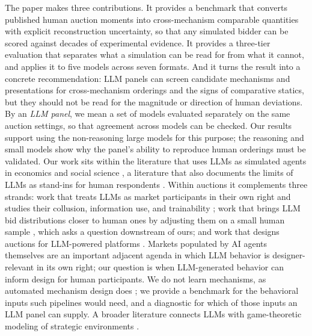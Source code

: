 \documentclass{article} %
\newif\ifmarkrev
\newcommand{\rev}[1]{\ifmarkrev\begingroup\color{red}#1\endgroup\else#1\fi}
\begin{document}
\rev{The paper makes three contributions.
It provides a benchmark that converts published human auction moments into cross-mechanism comparable quantities with explicit reconstruction uncertainty, so that any simulated bidder can be scored against decades of experimental evidence.
It provides a three-tier evaluation that separates what a simulation can be read for from what it cannot, and applies it to five models across seven formats.
And it turns the result into a concrete recommendation: LLM panels can screen candidate mechanisms and presentations for cross-mechanism orderings and the signs of comparative statics, but they should not be read for the magnitude or direction of human deviations. By an \emph{LLM panel}, we mean a set of models evaluated separately on the same auction settings, so that agreement across models can be checked. Our results support using the non-reasoning large models for this purpose; the reasoning and small models show why the panel's ability to reproduce human orderings must be validated.
Our work sits within the literature that uses LLMs as simulated agents in economics and social science \citep{aher2023using, park2023generative, horton2023large, manning2024automated}, a literature that also documents the limits of LLMs as stand-ins for human respondents \citep{achiam2023gpt, bubeck2023sparks, wan2023kelly}.
Within auctions it complements three strands: work that treats LLMs as market participants in their own right and studies their collusion, information use, and trainability \citep{fish2024algorithmic, chen2023put, infobid2025, lu2025claude, tsuchihashi2023homo, auctionnet2024}; work that brings LLM bid distributions closer to human ones by adjusting them on a small human sample \citep{corrigan2025usefulness}, which asks a question downstream of ours; and work that designs auctions for LLM-powered platforms \citep{duetting2024mechanism, ramage2024adauctions}.
Markets populated by AI agents themselves are an important adjacent agenda in which LLM behavior is designer-relevant in its own right; our question is when LLM-generated behavior can inform design for human participants.
We do not learn mechanisms, as automated mechanism design does \citep{dutting2024optimal, curry102automated, wang2024gemnet, feng2018deep, wang2025bundleflow, ravindranath2023data}; we provide a benchmark for the behavioral inputs such pipelines would need, and a diagnostic for which of those inputs an LLM panel can supply.
A broader literature connects LLMs with game-theoretic modeling of strategic environments \citep{daskalakis2024charting, huang2025accelerated, soumalias2025llm, jiang2025incentive, wang2026llm}.}
\end{document}
